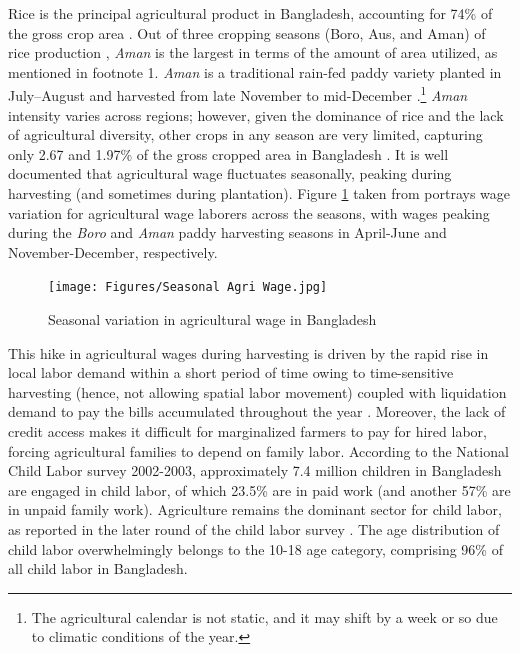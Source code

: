 \documentclass[12pt,letterpaper]{article}
\newcommand{\0}{\ensuremath{\mbox{\boldmath $0$}}}
\begin{document}
Rice is the principal agricultural product in Bangladesh, accounting for 74\% of the gross crop area \citep{tisdell2019agricultural}. Out of three cropping seasons (Boro, Aus, and Aman) of rice production \citep{laborte2017riceatlas}, \textit{Aman} is the largest in terms of the amount of area utilized, as mentioned in footnote 1. \textit{Aman} is a traditional rain-fed paddy variety planted in July–August and harvested from late November to mid-December \citep{shelley2016rice}.\footnote{The agricultural calendar is not static, and it may shift by a week or so due to climatic conditions of the year.} \textit{Aman} intensity varies across regions; however, given the dominance of rice and the lack of agricultural diversity, other crops in any season are very limited, capturing only 2.67 and 1.97\% of the gross cropped area in Bangladesh \citep{tisdell2019agricultural}. It is well documented that agricultural wage fluctuates seasonally, peaking during harvesting (and sometimes during plantation). Figure \ref{wage} taken from \citet{rahman1988labour} portrays wage variation for agricultural wage laborers across the seasons, with wages peaking during the \textit{Boro} and \textit{Aman} paddy harvesting seasons in April-June and November-December, respectively.

\begin{figure}[h!]
\centering
\texttt{[image: Figures/Seasonal Agri Wage.jpg]}\\
\caption{Seasonal variation in agricultural wage in Bangladesh}
\label{wage}
\end{figure}

This hike in agricultural wages during harvesting is driven by the rapid rise in local labor demand within a short period of time owing to time-sensitive harvesting (hence, not allowing spatial labor movement) coupled with liquidation demand to pay the bills accumulated throughout the year \citep{burke2019sell}. Moreover, the lack of credit access makes it difficult for marginalized farmers to pay for hired labor, forcing agricultural families to depend on family labor. According to the \cite{bbs2003report} National Child Labor survey 2002-2003, approximately 7.4 million children in Bangladesh are engaged in child labor, of which 23.5\% are in paid work (and another 57\% are in unpaid family work). Agriculture remains the dominant sector for child labor, as reported in the later round of the child labor survey \cite{bbs2013report}. The age distribution of child labor overwhelmingly belongs to the 10-18 age category, comprising 96\% of all child labor in Bangladesh.
\end{document}
